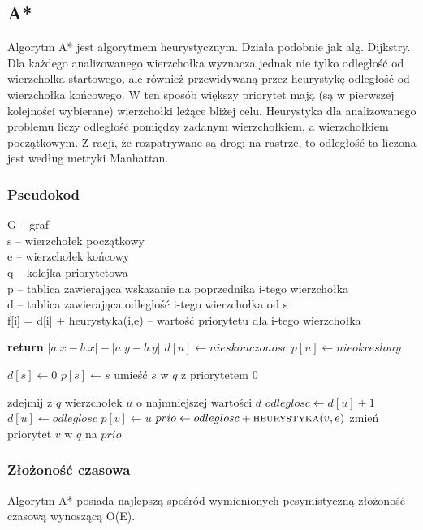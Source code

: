 \documentclass[11pt,a4paper]{article}
\begin{document}
\subsection{A*}
Algorytm A* jest algorytmem heurystycznym. Działa podobnie jak alg. Dijkstry. Dla każdego
analizowanego wierzchołka wyznacza jednak nie tylko odległość od wierzcholka startowego, ale również
przewidywaną przez heurystykę odległość od wierzchołka końcowego. W ten sposób większy priorytet mają
(są w pierwszej kolejności wybierane) wierzchołki leżące bliżej celu.
Heurystyka dla analizowanego problemu liczy odległość pomiędzy zadanym wierzchołkiem, 
a wierzchołkiem początkowym. Z racji, że rozpatrywane są drogi na rastrze, to odległość ta 
liczona jest według metryki Manhattan.
\subsubsection{Pseudokod}
G – graf\\
s – wierzchołek początkowy\\
e – wierzchołek końcowy\\
q – kolejka priorytetowa\\
p – tablica zawierająca wskazanie na poprzednika i-tego wierzchołka\\
d – tablica zawierająca odleglość i-tego wierzchołka od s\\
f[i] = d[i] + heurystyka(i,e) – wartość priorytetu dla i-tego wierzchołka\\
\begin{algorithmic}
	\State \textbf{return} \(\lvert{a.x-b.x}\rvert-\lvert{a.y-b.y}\rvert\)
\EndFunction
\Statex
{}
   	\State $d[u]\gets nieskonczonosc$
   	\State $p[u]\gets nieokreslony$
   \EndFor
   
   \State $d[s]\gets 0$
   \State $p[s]\gets s$
   \State umieść $s$ w $q$ z priorytetem 0
   
   	\State zdejmij z $q$ wierzchołek $u$ o najmniejszej wartości $d$
   	 \Return
   	\EndIf
   		\State $odleglosc\gets d[u]+1$
   			\State $d[u]\gets odleglosc$
   			\State $p[v]\gets u$
   			\State $prio\gets odleglosc + \Call{heurystyka}{v,e}$
   			\State zmień priorytet $v$ w $q$ na $prio$
   		\EndIf
   \EndFor
   \EndWhile
\EndFunction
\end{algorithmic}
\subsubsection{Złożoność czasowa}
Algorytm A* posiada najlepszą spośród wymienionych pesymistyczną złożoność czasową wynoszącą O(E).
\end{document}
